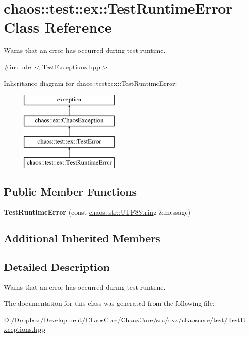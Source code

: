 \hypertarget{classchaos_1_1test_1_1ex_1_1_test_runtime_error}{}\section{chaos\+:\+:test\+:\+:ex\+:\+:Test\+Runtime\+Error Class Reference}
\label{classchaos_1_1test_1_1ex_1_1_test_runtime_error}


Warns that an error has occurred during test runtime.  




{\ttfamily \#include $<$Test\+Exceptions.\+hpp$>$}

Inheritance diagram for chaos\+:\+:test\+:\+:ex\+:\+:Test\+Runtime\+Error\+:\begin{figure}[H]
\begin{center}
\leavevmode
\includegraphics[height=4.000000cm]{classchaos_1_1test_1_1ex_1_1_test_runtime_error}
\end{center}
\end{figure}
\subsection*{Public Member Functions}
\begin{DoxyCompactItemize}
\item 
\hypertarget{classchaos_1_1test_1_1ex_1_1_test_runtime_error_a7ebdd71d1296663a844aefd8e409766e}{}{\bfseries Test\+Runtime\+Error} (const \hyperlink{classchaos_1_1str_1_1_u_t_f8_string}{chaos\+::str\+::\+U\+T\+F8\+String} \&message)\label{classchaos_1_1test_1_1ex_1_1_test_runtime_error_a7ebdd71d1296663a844aefd8e409766e}

\end{DoxyCompactItemize}
\subsection*{Additional Inherited Members}


\subsection{Detailed Description}
Warns that an error has occurred during test runtime. 

The documentation for this class was generated from the following file\+:\begin{DoxyCompactItemize}
\item 
D\+:/\+Dropbox/\+Development/\+Chaos\+Core/\+Chaos\+Core/src/cxx/chaoscore/test/\hyperlink{_test_exceptions_8hpp}{Test\+Exceptions.\+hpp}\end{DoxyCompactItemize}
